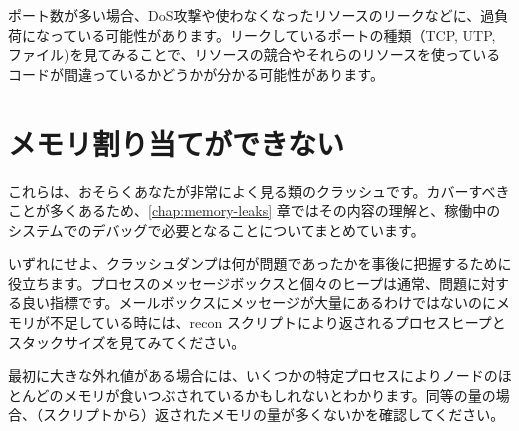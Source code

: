 ポート数が多い場合、DoS攻撃や使わなくなったリソースのリークなどに、過負荷になっている可能性があります。リークしているポートの種類（TCP, UTP, ファイル)を見てみることで、リソースの競合やそれらのリソースを使っているコードが間違っているかどうかが分かる可能性があります。

\section{メモリ割り当てができない}

これらは、おそらくあなたが非常によく見る類のクラッシュです。カバーすべきことが多くあるため、\ref{chap:memory-leaks} 章ではその内容の理解と、稼働中のシステムでのデバッグで必要となることについてまとめています。

いずれにせよ、クラッシュダンプは何が問題であったかを事後に把握するために役立ちます。プロセスのメッセージボックスと個々のヒープは通常、問題に対する良い指標です。メールボックスにメッセージが大量にあるわけではないのにメモリが不足している時には、recon スクリプトにより返されるプロセスヒープとスタックサイズを見てみてください。

最初に大きな外れ値がある場合には、いくつかの特定プロセスによりノードのほとんどのメモリが食いつぶされているかもしれないとわかります。同等の量の場合、（スクリプトから）返されたメモリの量が多くないかを確認してください。

